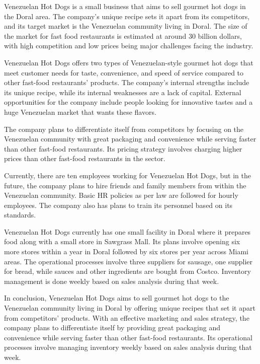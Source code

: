 Venezuelan Hot Dogs is a small business that aims to sell gourmet hot dogs in the Doral area. The company's unique recipe sets it apart from its competitors, and its target market is the Venezuelan community living in Doral. The size of the market for fast food restaurants is estimated at around 30 billion dollars, with high competition and low prices being major challenges facing the industry.

Venezuelan Hot Dogs offers two types of Venezuelan-style gourmet hot dogs that meet customer needs for taste, convenience, and speed of service compared to other fast-food restaurants' products. The company's internal strengths include its unique recipe, while its internal weaknesses are a lack of capital. External opportunities for the company include people looking for innovative tastes and a huge Venezuelan market that wants these flavors.

The company plans to differentiate itself from competitors by focusing on the Venezuelan community with great packaging and convenience while serving faster than other fast-food restaurants. Its pricing strategy involves charging higher prices than other fast-food restaurants in the sector.

Currently, there are ten employees working for Venezuelan Hot Dogs, but in the future, the company plans to hire friends and family members from within the Venezuelan community. Basic HR policies as per law are followed for hourly employees. The company also has plans to train its personnel based on its standards.

Venezuelan Hot Dogs currently has one small facility in Doral where it prepares food along with a small store in Sawgrass Mall. Its plans involve opening six more stores within a year in Doral followed by six stores per year across Miami areas. The operational processes involve three suppliers for sausage, one supplier for bread, while sauces and other ingredients are bought from Costco. Inventory management is done weekly based on sales analysis during that week.

In conclusion, Venezuelan Hot Dogs aims to sell gourmet hot dogs to the Venezuelan community living in Doral by offering unique recipes that set it apart from competitors' products. With an effective marketing and sales strategy, the company plans to differentiate itself by providing great packaging and convenience while serving faster than other fast-food restaurants. Its operational processes involve managing inventory weekly based on sales analysis during that week.